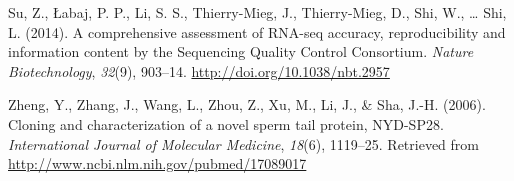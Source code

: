 \documentclass[12pt,twoside]{reedthesis}
\theoremstyle{definition}
\theoremstyle{definition}
\theoremstyle{remark}
\begin{document}
  \hypertarget{ref-Su2014}{}
  Su, Z., Łabaj, P. P., Li, S. S., Thierry-Mieg, J., Thierry-Mieg, D.,
  Shi, W., \ldots{} Shi, L. (2014). A comprehensive assessment of RNA-seq
  accuracy, reproducibility and information content by the Sequencing
  Quality Control Consortium. \emph{Nature Biotechnology}, \emph{32}(9),
  903--14. \url{http://doi.org/10.1038/nbt.2957}
  
  \hypertarget{ref-Zheng2006}{}
  Zheng, Y., Zhang, J., Wang, L., Zhou, Z., Xu, M., Li, J., \& Sha, J.-H.
  (2006). Cloning and characterization of a novel sperm tail protein,
  NYD-SP28. \emph{International Journal of Molecular Medicine},
  \emph{18}(6), 1119--25. Retrieved from
  \url{http://www.ncbi.nlm.nih.gov/pubmed/17089017}


\end{document}
